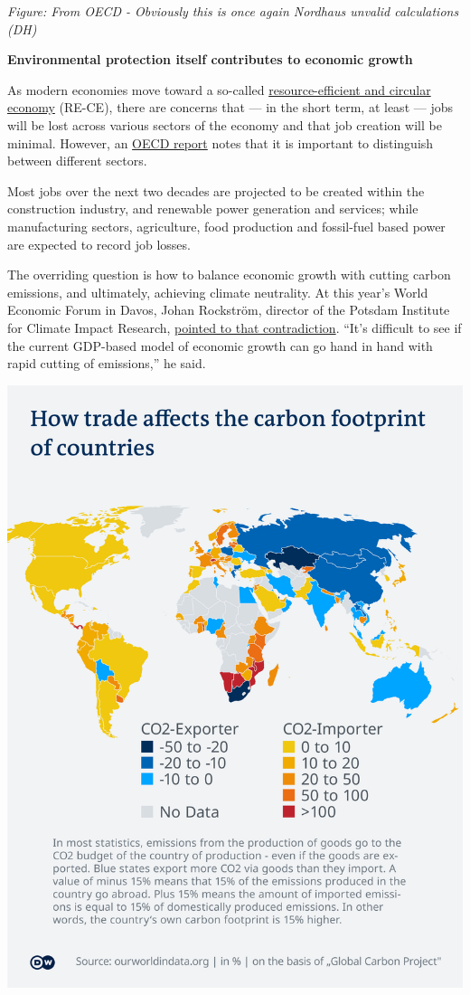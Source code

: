 \documentclass[
]{book}
\begin{document}
\emph{Figure: From OECD - Obviously this is once again Nordhaus unvalid calculations (DH)}

\textbf{Environmental protection itself contributes to economic growth}

As modern economies move toward a so-called
\href{https://www.oecd-ilibrary.org/docserver/c1f3c8d0-en.pdf}{resource-efficient and circular economy}
(RE-CE), there are concerns that --- in the short term, at least --- jobs will be lost across various sectors of the economy and that job creation will be minimal.
However, an \href{https://www.oecd-ilibrary.org/docserver/28e768df-en.pdf}{OECD report}
notes that it is important to distinguish between different sectors.

Most jobs over the next two decades are projected to be created within the construction industry, and renewable power generation and services; while manufacturing sectors, agriculture, food production and fossil-fuel based power are expected to record job losses.

The overriding question is how to balance economic growth with cutting carbon emissions, and ultimately, achieving climate neutrality. At this year's World Economic Forum in Davos, Johan Rockström, director of the Potsdam Institute for Climate Impact Research,
\href{https://www.nytimes.com/2020/01/21/climate/greta-thunberg-trump-davos.html}{pointed to that contradiction}. ``It's difficult to see if the current GDP-based model of economic growth can go hand in hand with rapid cutting of emissions,'' he said.

\includegraphics{fig/trade_carbon_footprint.png}
\end{document}
